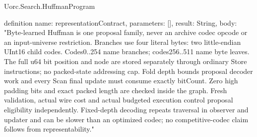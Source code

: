\begin{lexlean}{Uorc.Search.HuffmanProgram}
\begin{semanticmodule}
definition{
  name: representationContract,
  parameters: [],
  result: String,
  body: "Byte-learned Huffman is one proposal family, never an archive codec opcode or an input-universe restriction. Branches use four literal bytes: two little-endian UInt16 child codes. Codes0..254 name branches; codes256..511 name byte leaves. The full u64 bit position and node are stored separately through ordinary Store instructions; no packed-state addressing cap. Fold depth bounds proposal decoder work and every Scan final update must consume exactly bitCount. Zero high padding bits and exact packed length are checked inside the graph. Fresh validation, actual wire cost and actual budgeted execution control proposal eligibility independently. Fixed-depth decoding repeats traversal in observer and updater and can be slower than an optimized codec; no competitive-codec claim follows from representability."
}
\end{semanticmodule}
\end{lexlean}
